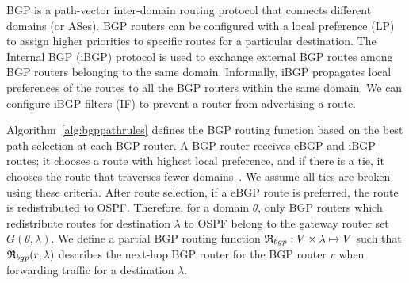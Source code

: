  BGP is a path-vector inter-domain routing protocol
that connects different domains (or ASes).  
BGP routers can be configured with a
local preference (LP)
to assign higher priorities to
specific routes for a 
particular destination. 
The Internal BGP (iBGP) protocol is used to 
exchange external BGP routes 
among BGP routers belonging
to the same domain. 
Informally, iBGP propagates local 
preferences of the routes to all the BGP 
routers within the same domain. 
We can configure iBGP 
filters (IF) to prevent a router from advertising 
a route. 

\iffull
 
Algorithm~\ref{alg:bgppathrules} defines the BGP routing function
based on the best path selection at each BGP router. 
\fi
A BGP router receives eBGP and iBGP routes; it  
chooses a route with highest local preference, 
and if there is a tie, it chooses the route that traverses 
fewer domains~\cite{bgp}. 
We assume all ties 
are broken using these criteria. After route selection, 
if a eBGP route is preferred, the route is redistributed to OSPF.
Therefore, for a domain $\theta$, only BGP routers which
redistribute routes for destination $\lambda$ to OSPF  
belong to the gateway router set $G(\theta, \lambda)$.
We define a partial BGP routing function 
$\mathfrak{R}_{bgp}: V \times \lambda \mapsto V$
such that
$\mathfrak{R}_{bgp}(r,\lambda)$
describes the next-hop BGP router for the BGP
router $r$ when forwarding traffic for a destination $\lambda$. 


